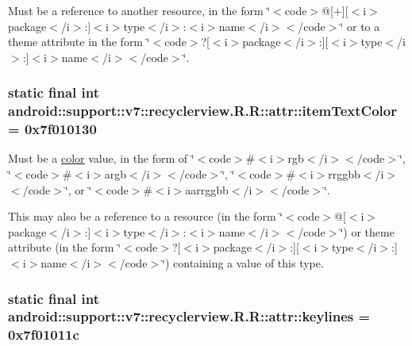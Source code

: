 Must be a reference to another resource, in the form \char`\"{}$<$code$>$@\mbox{[}+\mbox{]}\mbox{[}$<$i$>$package$<$/i$>$:\mbox{]}$<$i$>$type$<$/i$>$:$<$i$>$name$<$/i$>$$<$/code$>$\char`\"{} or to a theme attribute in the form \char`\"{}$<$code$>$?\mbox{[}$<$i$>$package$<$/i$>$:\mbox{]}\mbox{[}$<$i$>$type$<$/i$>$:\mbox{]}$<$i$>$name$<$/i$>$$<$/code$>$\char`\"{}. \hypertarget{classandroid_1_1support_1_1v7_1_1recyclerview_1_1_r_1_1attr_24fcc15f2464d4ce3610946c35017749}{
\subsubsection[{itemTextColor}]{\setlength{\rightskip}{0pt plus 5cm}static final int android::support::v7::recyclerview.R.R::attr::itemTextColor = 0x7f010130}}
\label{classandroid_1_1support_1_1v7_1_1recyclerview_1_1_r_1_1attr_24fcc15f2464d4ce3610946c35017749}


Must be a \hyperlink{classandroid_1_1support_1_1v7_1_1recyclerview_1_1_r_1_1color}{color} value, in the form of \char`\"{}$<$code$>$\#$<$i$>$rgb$<$/i$>$$<$/code$>$\char`\"{}, \char`\"{}$<$code$>$\#$<$i$>$argb$<$/i$>$$<$/code$>$\char`\"{}, \char`\"{}$<$code$>$\#$<$i$>$rrggbb$<$/i$>$$<$/code$>$\char`\"{}, or \char`\"{}$<$code$>$\#$<$i$>$aarrggbb$<$/i$>$$<$/code$>$\char`\"{}. 

This may also be a reference to a resource (in the form \char`\"{}$<$code$>$@\mbox{[}$<$i$>$package$<$/i$>$:\mbox{]}$<$i$>$type$<$/i$>$:$<$i$>$name$<$/i$>$$<$/code$>$\char`\"{}) or theme attribute (in the form \char`\"{}$<$code$>$?\mbox{[}$<$i$>$package$<$/i$>$:\mbox{]}\mbox{[}$<$i$>$type$<$/i$>$:\mbox{]}$<$i$>$name$<$/i$>$$<$/code$>$\char`\"{}) containing a value of this type. \hypertarget{classandroid_1_1support_1_1v7_1_1recyclerview_1_1_r_1_1attr_6e5e66cc40cebca6f951bb7b9886e2bc}{
\subsubsection[{keylines}]{\setlength{\rightskip}{0pt plus 5cm}static final int android::support::v7::recyclerview.R.R::attr::keylines = 0x7f01011c}}
\label{classandroid_1_1support_1_1v7_1_1recyclerview_1_1_r_1_1attr_6e5e66cc40cebca6f951bb7b9886e2bc}


